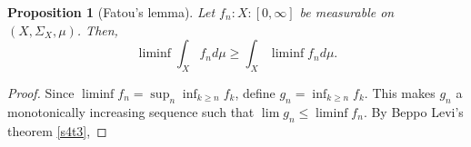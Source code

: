 \documentclass{article}
\theoremstyle{plain}
\numberwithin{thm}{section}
\theoremstyle{plain}
\newtheorem{prop}{Proposition}
\numberwithin{prop}{section}
\theoremstyle{definition}
\numberwithin{defn}{section}
\theoremstyle{remark}
\theoremstyle{plain}
\numberwithin{cor}{section}
\numberwithin{equation}{section}
\begin{document}
\begin{prop}[Fatou's lemma] Let $f_n: X: [0, \infty]$ be measurable on $(X,
\Sigma_X, \mu)$. Then,
\[
\liminf\int_X f_n d\mu \ge \int_X\liminf f_n d\mu.
\]
\end{prop}
\begin{proof}
Since $\liminf f_n = \sup_{n}\inf_{k \ge n} f_k$, define $g_n = \inf_{k \ge n}
f_k$. This makes $g_n$ a monotonically increasing sequence such that $\lim g_n
\le \liminf f_n$. By Beppo Levi's theorem \ref{s4t3},

\end{proof}
\end{document}

